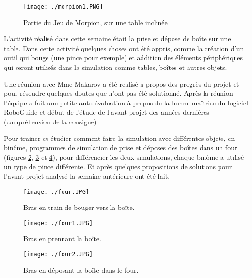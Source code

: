 \documentclass[a4paper,twoside]{articlewithlogo}
\begin{document}
	
	\begin{figure}[H]
		\begin{center}	
			\texttt{[image: ./morpion1.PNG]}
			\caption{Partie du Jeu de Morpion, sur une table inclinée}
			\label{fig:morpion1}
		\end{center}
	\end{figure}
	
	\pagebreak
	L'activité réalisé dans cette semaine était la prise et dépose de boîte sur une table. Dans cette activité quelques choses ont été appris, comme la création d'un outil qui bouge (une pince pour exemple) et addition des éléments périphériques qui seront utilisés dans la simulation comme tables, boîtes et autres objets.
	
	
	Une réunion avec Mme Makarov a été realisé a propos  des progrès du projet et pour résoudre quelques doutes que n'ont pas été solutionné.  Après la réunion l'équipe a fait une petite auto-évaluation à propos de la bonne maîtrise du logiciel RoboGuide et début de l'étude de l’avant-projet des années dernières (compréhension de la consigne)
	
	Pour trainer et étudier comment faire la simulation avec différentes objets, en binôme, programmes de simulation de prise et déposes des boîtes dans un four (figures \ref{fig:four}, \ref{fig:four1} et \ref{fig:four2}), pour différencier les deux simulations, chaque binôme a utilisé un type de pince différente. Et après quelques propositions de solutions pour l'avant-projet analysé la semaine antérieure ont été fait.
		
	\begin{figure}[H]
		\begin{center}	
			\texttt{[image: ./four.JPG]}
			\caption{Bras en train de bouger vers la boîte.}
			\label{fig:four}
		\end{center}
	\end{figure}
	
	\begin{figure}[H]
		\begin{center}	
			\texttt{[image: ./four1.JPG]}
			\caption{Bras en prennant la boîte.}
			\label{fig:four1}
		\end{center}
	\end{figure}
	
	\begin{figure}[H]
		\begin{center}	
			\texttt{[image: ./four2.JPG]}
			\caption{Bras en déposant la boîte dans le four.}
			\label{fig:four2}
		\end{center}
	\end{figure}
	
\end{document}
